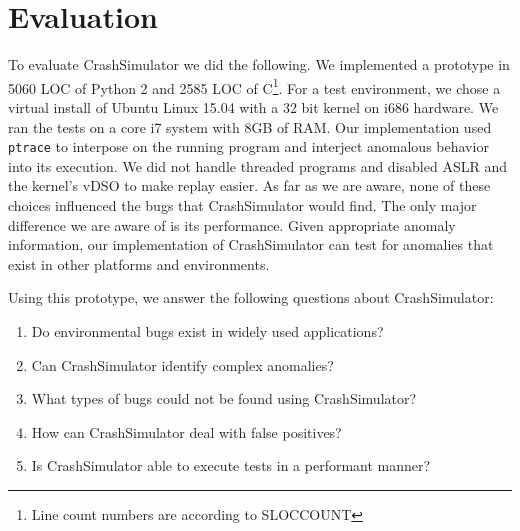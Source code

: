 \section{Evaluation}

To evaluate CrashSimulator we did the following.
We implemented a prototype in 5060 LOC of Python 2 and 2585 LOC of C\footnote{
Line count numbers are according to SLOCCOUNT}.  For a test
environment, we chose a virtual install of Ubuntu Linux 15.04 with a 32 bit kernel on i686 hardware.
We ran the tests on a core i7 system with 8GB of RAM. Our
implementation used {\tt ptrace} to interpose on the running program and
interject anomalous behavior into its execution.
We did not handle threaded programs and disabled ASLR and the kernel's vDSO to make replay
easier.  As far as we are aware, none of these choices influenced the bugs
that CrashSimulator would find.  The only major difference we are aware of 
is its performance.
Given appropriate anomaly information, our implementation of CrashSimulator can
test for anomalies that exist in other platforms and environments.  

Using this prototype, we answer the following questions about CrashSimulator:

\begin{enumerate}
   \item{Do environmental bugs exist in widely used applications?}
   \item{Can CrashSimulator identify complex anomalies?}
   \item{What types of bugs could not be found using CrashSimulator?}
   \item{How can CrashSimulator deal with false positives?}
   \item{Is CrashSimulator able to execute tests in a performant manner?}
\end{enumerate}





